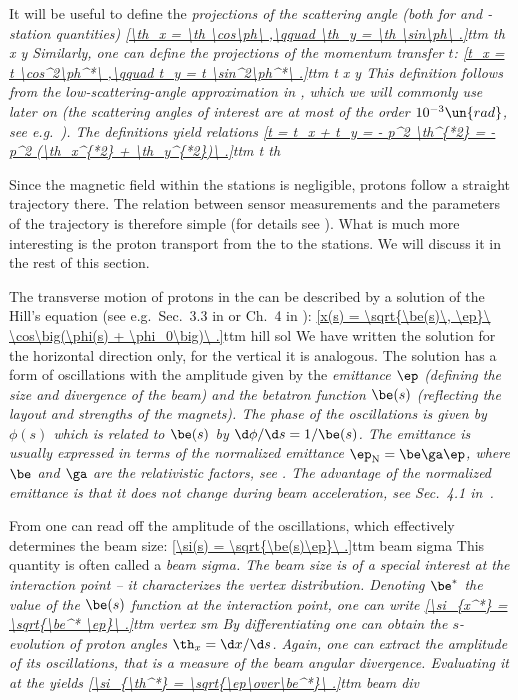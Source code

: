 It will be useful to define the \em{projections of the scattering angle} (both for  and -station quantities)
\eqref{\th_x = \th \cos\ph\ ,\qquad \th_y = \th \sin\ph\ .}{ttm th x y}
Similarly, one can define the projections of the momentum transfer $t$:
\eqref{t_x = t \cos^2\ph^*\ ,\qquad t_y = t \sin^2\ph^*\ .}{ttm t x y}
This definition follows from the low-scattering-angle approximation in , which we will commonly use later on (the scattering angles of interest are at most of the order $10^{-3}\un{rad}$, see e.g.~). The definitions  yield relations
\eqref{t = t_x + t_y = - p^2 \th^{*2} = - p^2 (\th_x^{*2} + \th_y^{*2})\ .}{ttm t th}

Since the magnetic field within the  stations is negligible, protons follow a straight trajectory there. The relation between  sensor measurements and the parameters of the trajectory is therefore simple (for details see ). What is much more interesting is the proton transport from the  to the  stations. We will discuss it in the rest of this section.

The transverse motion of protons in the  can be described by a solution of the Hill's equation (see e.g.~Sec.~3.3 in  or Ch.~4 in ):
\eqref{x(s) = \sqrt{\be(s)\, \ep}\ \cos\big(\phi(s) + \phi_0\big)\ .}{ttm hill sol}
We have written the solution for the horizontal direction only, for the vertical it is analogous. The solution has a form of oscillations with the amplitude given by the \em{emittance} $\ep$ (defining the size and divergence of the beam) and the \em{betatron function} $\be(s)$ (reflecting the layout and strengths of the  magnets). The \em{phase} of the oscillations is given by $\phi(s)$ which is related to $\be(s)$ by $\d\phi/\d s = 1/\be(s)$. The emittance is usually expressed in terms of the \em{normalized emittance} $\ep_{\rm N} = \be\ga \ep$, where $\be$ and $\ga$ are the relativistic factors, see . The advantage of the normalized emittance is that it does not change during beam acceleration, see Sec.~4.1 in~.

From  one can read off the amplitude of the oscillations, which effectively determines the beam size:
\eqref{\si(s) = \sqrt{\be(s)\ep}\ .}{ttm beam sigma}
This quantity is often called a \em{beam sigma}. The beam size is of a special interest at the interaction point -- it characterizes the vertex distribution. Denoting $\be^*$ the value of the $\be(s)$ function at the interaction point, one can write
\eqref{\si_{x^*} = \sqrt{\be^* \ep}\ .}{ttm vertex sm}
By differentiating  one can obtain the $s$-evolution of proton angles $\th_x = \d x/\d s$. Again, one can extract the amplitude of its oscillations, that is a measure of the beam angular divergence. Evaluating it at the  yields
\eqref{\si_{\th^*} = \sqrt{\ep\over\be^*}\ .}{ttm beam div}

